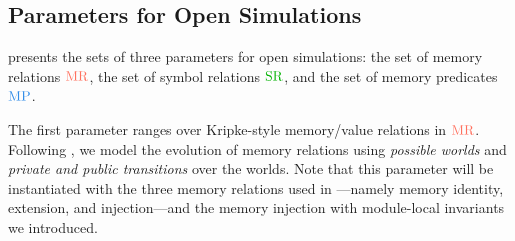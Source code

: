 \subsection{Parameters for Open Simulations}
\label{sec:main-verification:parameter}

 presents
the sets of three parameters for open simulations:
the set of memory relations $\MREL$, the set of symbol relations $\SREL$, and the set of memory predicates $\MPRED$.




The first parameter ranges over Kripke-style memory/value relations in $\MREL$.
Following \cite{DBLP:conf/icfp/DreyerNB10,pb}, we model the
evolution of memory relations using \emph{possible worlds} and \emph{private and public transitions}
over the worlds.
Note that this parameter will be instantiated with the three memory relations used in \cc{}---namely memory
identity, extension, and injection---and the memory injection with module-local invariants we introduced.

